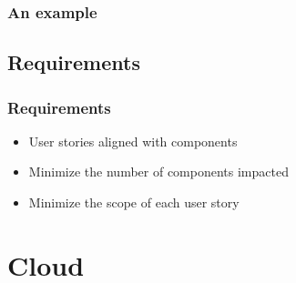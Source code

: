 \documentclass{beamer}
\begin{document}
	\begin{frame}
		\frametitle{An example}
	\end{frame}
	
	\subsection{Requirements}
	\begin{frame}
		\frametitle{Requirements}
		
		\begin{itemize}
			\item User stories aligned with components
			\medskip
			\item Minimize the number of components impacted
			\medskip
			\item Minimize the scope of each user story
		\end{itemize}
	\end{frame}
	
	\section{Cloud}
\end{document}
